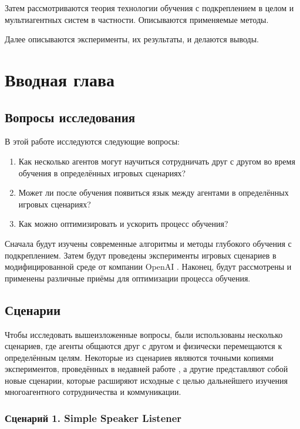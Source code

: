 Затем рассмотриваются теория технологии обучения с подкреплением в целом и мультиагентных систем в частности. Описываются применяемые методы.

Далее описываются эксперименты, их результаты, и делаются выводы.

\chapter{Вводная глава}

\section{Вопросы исследования} \label{intro-questions}

В этой работе исследуются следующие вопросы:
\begin{enumerate}[1.]
	\item Как несколько агентов могут научиться сотрудничать друг с другом во время обучения в определённых игровых сценариях?
	\item Может ли после обучения появиться язык между агентами в определённых игровых сценариях?
	\item Как можно оптимизировать и ускорить процесс обучения?
\end{enumerate}

Сначала будут изучены современные алгоритмы и методы глубокого обучения с подкреплением. Затем будут проведены эксперименты игровых сценариев в модифицированной среде от компании OpenAI \cite{OpenAI-Gym}. Наконец, будут рассмотрены и применены различные приёмы для оптимизации процесса обучения.

\section{Сценарии} \label{intro:sec2}

Чтобы исследовать вышеизложенные вопросы, были использованы несколько сценариев, где агенты общаются друг с другом и физически перемещаются к определённым целям. Некоторые из сценариев являются точными копиями экспериментов, проведённых в недавней работе \cite{lowe2017multiagent}, а другие представляют собой новые сценарии, которые расширяют исходные с целью дальнейшего изучения многоагентного сотрудничества и коммуникации.

\subsection{Сценарий 1. Simple Speaker Listener} \label{intro:ssl}

